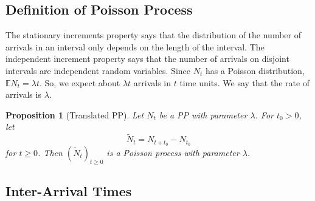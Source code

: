\documentclass[11pt,a4paper]{article}
\newtheorem{definition}{Definition}
\newtheorem{proposition}{Proposition}
\begin{document}
\subsection{Definition of Poisson Process}
\begin{center}
\end{center}
The stationary increments property says that the distribution of the number of arrivals in an interval only depends on the length of the interval. The independent increment property says that the number of arrivals on disjoint intervals are independent random variables. Since $N_t$ has a Poisson distribution, $\mathbb{E} N_t=\lambda t$. So, we expect about $\lambda t$ arrivals in $t$ time units. We say that the rate of arrivals is $\lambda$.
\begin{proposition}[Translated PP]
    Let $N_t$ be a PP with parameter $\lambda$. For $t_0 > 0$, let $$\tilde{N}_t=N_{t+t_0}-N_{t_0}$$ for $t\geq 0$. Then $(\tilde{N}_t)_{t\geq 0}$ is a Poisson process with parameter $\lambda$.
\end{proposition}

\subsection{Inter-Arrival Times}
\end{document}
